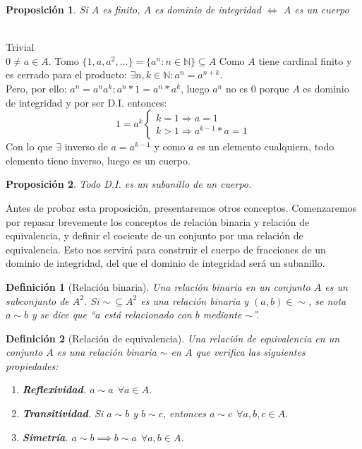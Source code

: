 \documentclass[11pt, a4paper, titlepage]{article}
\makeatletter
\newif\IfInSansMode
\let\oldsf\sffamily
\renewcommand*{\sffamily}{\oldsf\mathversion{sans}\InSansModetrue}
\let\oldnorm\normalfont
\renewcommand*{\normalfont}{\oldnorm\InSansModefalse\mathversion{normal}}
\renewenvironment{proof}[1][\proofname] {\vspace{-15pt}\par\pushQED{\qed}\normalfont\topsep6\p@\@plus6\p@\relax\trivlist\item[\hskip\labelsep\it#1\@addpunct{.}]\ignorespaces}{\popQED\endtrivlist\@endpefalse}
\renewenvironment{proof}[1][\proofname] {\par\pushQED{\qed}\normalfont\topsep6\p@\@plus6\p@\relax\trivlist\item[\hskip\labelsep\itshape\sffamily#1\@addpunct{.}]\ignorespaces}{\popQED\endtrivlist\@endpefalse}
\theoremstyle{theorem-style}
\newtheorem{nprop}{Proposición}[section]
\theoremstyle{definition-style}
\newtheorem{ndef}{Definición}[section]
\theoremstyle{remark-style}
\theoremstyle{example-style}
\newenvironment{nlist}
{\begin{enumerate}
\renewcommand\labelenumi{(\emph{\roman{enumi})}}}
{\end{enumerate}}
\makeatother
\begin{document}
\begin{nprop}
	Si $A$ es finito, $A$ es dominio de integridad $\iff$ $A$ es un cuerpo
\end{nprop}
\begin{proof}\hfill\\
	\boxed{\Leftarrow} Trivial\\
	\boxed{\Rightarrow} $0 \neq a \in A$.
Tomo $\{1,a,a^2,\dots\} = \{a^n: n\in \mathbb{N}\} \subseteq A$
Como $A$ tiene cardinal finito y es cerrado para el producto: $\exists n,k \in \mathbb{N} : a^n = a^{n+k}$.\\
Pero, por ello: $a^n = a^n a^k; a^n * 1 = a^n * a^k$, luego $a^n$ no es 0 porque $A$ es dominio de integridad y por ser D.I. entonces:
\[
1=a^k \begin{cases}
	k = 1 \Rightarrow a = 1\\
	k > 1 \Rightarrow a^{k-1}*a = 1

\end{cases}\]
Con lo que $\exists$ inverso de $a = a^{k-1}$ y como $a$ es un elemento cualquiera, todo elemento tiene inverso, luego es un cuerpo.
\end{proof}


\begin{nprop}
	Todo D.I. es un subanillo de un cuerpo.
\end{nprop}


Antes de probar esta proposición, presentaremos otros conceptos. Comenzaremos por repasar brevemente los conceptos de relación binaria y
relación de equivalencia, y definir el cociente de un conjunto por una relación de equivalencia. Esto nos servirá
para construir el cuerpo de fracciones de un dominio de integridad, del que el dominio de integridad será un subanillo.

\begin{ndef}[Relación binaria]
  Una relación binaria en un conjunto $A$ es un subconjunto de $A^2$.
  Si $\sim \ \subseteq A^2$ es una relación binaria y $(a,b) \in \sim$, se nota $a \sim b$
  y se dice que ``$a$ está relacionado con $b$ mediante $\sim$''.
\end{ndef}

\begin{ndef}[Relación de equivalencia]
  Una relación de equivalencia en un conjunto $A$ es una relación binaria $\sim$ en $A$ que verifica las siguientes propiedades:

  \begin{nlist}
  \item \textbf{\emph{Reflexividad}}. $a \sim a \ \ \forall a \in A$.
  \item \textbf{\emph{Transitividad}}. Si $a \sim b$ y $b \sim c$, entonces $a \sim c \ \ \forall a,b,c \in A$.
    \item \textbf{\emph{Simetría}}. $a \sim b \implies b \sim a \ \ \forall a,b \in A$.
  \end{nlist}
\end{ndef}
\end{document}
